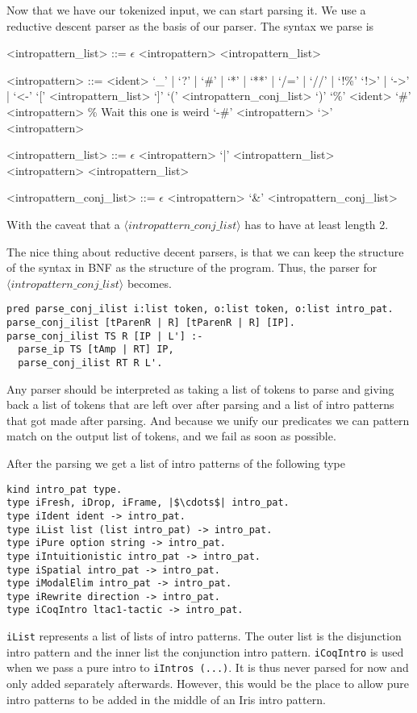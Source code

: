 \documentclass[thesis.tex]{subfiles}
\begin{document}
Now that we have our tokenized input, we can start parsing it. We use a reductive descent parser as the basis of our parser. The syntax we parse is
\begin{grammar}
  <intropattern\_list> ::= $\epsilon$
  \alt <intropattern> <intropattern\_list>

  <intropattern> ::= <ident>
  \alt `_' | `?' | `#' | `*' | `**' | `/=' | `//' | `!\%'
  \alt `!>' | `->' | `<-'
  \alt `[' <intropattern\_list> `]'
  \alt `(' <intropattern\_conj\_list> `)'
  \alt `\%' <ident>
  \alt `#' <intropattern> \% Wait this one is weird
  \alt `-#' <intropattern>
  \alt `>' <intropattern>

  <intropattern\_list> ::= $\epsilon$
  \alt <intropattern> `|' <intropattern\_list>
  \alt <intropattern> <intropattern\_list>

  <intropattern\_conj\_list> ::= $\epsilon$
  \alt <intropattern> `&' <intropattern\_conj\_list>
\end{grammar}
With the caveat that a $\langle intropattern\_conj\_list\rangle$ has to have at least length 2.

The nice thing about reductive decent parsers, is that we can keep the structure of the syntax in BNF as the structure of the program. Thus, the parser for $\langle intropattern\_conj\_list\rangle$ becomes.
\begin{verbatim}
pred parse_conj_ilist i:list token, o:list token, o:list intro_pat.
parse_conj_ilist [tParenR | R] [tParenR | R] [IP].
parse_conj_ilist TS R [IP | L'] :-
  parse_ip TS [tAmp | RT] IP,
  parse_conj_ilist RT R L'.
\end{verbatim}
Any parser should be interpreted as taking a list of tokens to parse and giving back a list of tokens that are left over after parsing and a list of intro patterns that got made after parsing. And because we unify our predicates we can pattern match on the output list of tokens, and we fail as soon as possible.

After the parsing we get a list of intro patterns of the following type
\begin{verbatim}
kind intro_pat type.
type iFresh, iDrop, iFrame, |$\cdots$| intro_pat.
type iIdent ident -> intro_pat.
type iList list (list intro_pat) -> intro_pat.
type iPure option string -> intro_pat.
type iIntuitionistic intro_pat -> intro_pat.
type iSpatial intro_pat -> intro_pat.
type iModalElim intro_pat -> intro_pat.
type iRewrite direction -> intro_pat.
type iCoqIntro ltac1-tactic -> intro_pat.
\end{verbatim}
\texttt{iList} represents a list of lists of intro patterns. The outer list is the disjunction intro pattern and the inner list the conjunction intro pattern. \texttt{iCoqIntro} is used when we pass a pure intro to \texttt{iIntros (...)}. It is thus never parsed for now and only added separately afterwards. However, this would be the place to allow pure intro patterns to be added in the middle of an Iris intro pattern.
\end{document}
